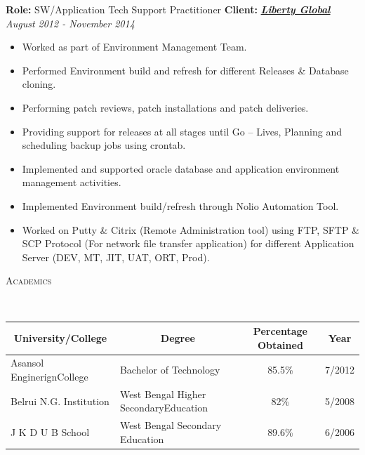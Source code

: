 \documentclass[9pt]{article}
\newenvironment{changemargin}[2]{%
  \begin{list}{}{%
    \setlength{\topsep}{0pt}%
    \setlength{\leftmargin}{#1}%
    \setlength{\rightmargin}{#2}%
    \setlength{\listparindent}{\parindent}%
    \setlength{\itemindent}{\parindent}%
    \setlength{\parsep}{\parskip}%
  }%
  \item[]}{\end{list}
}
\newcommand{\lineover}{
	\begin{changemargin}{-0.05in}{-0.05in}
		\vspace*{-8pt}
		\hrulefill \\
		\vspace*{-2pt}
	\end{changemargin}
}
\newcommand{\header}[1]{
	\begin{changemargin}{-0.5in}{-0.5in}
		\scshape{#1}\\
  	\lineover
	\end{changemargin}
}
\newenvironment{body} {
	\vspace*{-16pt}
	\begin{changemargin}{-0.25in}{-0.5in}
  }
	{\end{changemargin}
}
\begin{document}
\begin{body}
        \textbf{Role:} SW/Application Tech Support Practitioner \hfill \textbf{Client:} \textbf{\emph{\href{http://www.libertyglobal.com}{Liberty Global}}} \hfill \emph{August 2012 - November 2014}\\
	\vspace*{-4pt}
	\begin{itemize} \itemsep -0pt
          \item Worked as part of Environment Management Team.
          \item Performed Environment build and refresh for different Releases \& Database cloning.
          \item Performing patch reviews, patch installations and patch deliveries.
          \item Providing support for releases at all stages until Go – Lives, Planning and scheduling
backup jobs using crontab.
          \item Implemented and supported oracle database and application environment
management activities.
          \item Implemented Environment build/refresh through Nolio Automation Tool.
          \item Worked on Putty \& Citrix (Remote Administration tool) using FTP, SFTP \& SCP
Protocol (For network file transfer application) for different Application Server (DEV,
MT, JIT, UAT, ORT, Prod).
	\end{itemize}

\end{body}

\smallskip

\header{Academics}
\begin{body}
\smallskip
\begin{table}[h]
\centering
\begin{tabular}{|l|l|c|c|}
\hline
\multicolumn{1}{|c|}{\textbf{University/College}} & \multicolumn{1}{c|}{\textbf{Degree}}  & \textbf{Percentage Obtained} & \textbf{Year} \\ \hline
Asansol EnginerignCollege                         & Bachelor of Technology                & 85.5\%                       & 7/2012        \\ \hline
Belrui N.G. Institution                           & West Bengal Higher SecondaryEducation & 82\%                       & 5/2008        \\ \hline
J K D U B School                                  & West Bengal Secondary Education       & 89.6\%                       & 6/2006        \\ \hline
\end{tabular}
\end{table}

\end{body}
\end{document}
